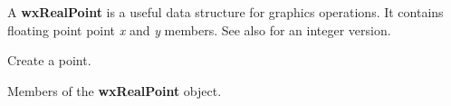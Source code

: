 \section{}\label{wxrealpoint}

A {\bf wxRealPoint} is a useful data structure for graphics operations.
It contains floating point point {\it x} and {\it y} members.
See also  for an integer version.









Create a point.



Members of the {\bf wxRealPoint} object.


